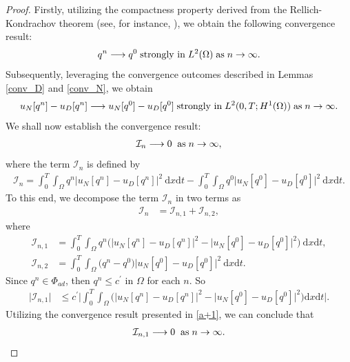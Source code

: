 \documentclass[a4paper,12pt,reqno,natbib]{amsart}
\newcommand{\dx} {\displaystyle\mathrm{d}x}
\newcommand{\dt} {\displaystyle\mathrm{d}t}
\begin{document}
\begin{proof}
 Firstly, utilizing the compactness property derived from the Rellich-Kondrachov theorem (see, for instance, \cite{brezis2010functional}), we obtain the following convergence result:
\begin{equation}\label{cv-0}
q^n\longrightarrow q^0\; \hbox{strongly in}\; L^2(\Omega)\; \hbox{as}\; n\rightarrow\infty.
\end{equation}
Subsequently, leveraging the convergence outcomes described in Lemmas \ref{conv_D} and \ref{conv_N}, we obtain
\begin{align} \label{a+1}
     u_N[q^n]- u_D[q^n] \longrightarrow  u_N[q^0]- u_D[q^0]\; \hbox{strongly in}\; L^2(0,T;H^1(\Omega))\; \hbox{as}\; n\rightarrow\infty.
\end{align}
We shall now establish the convergence result:
\begin{align*}
    \mathcal{I}_n \longrightarrow  0 \;\; \hbox{as}\; n\rightarrow\infty,
\end{align*}
where the term $\mathcal{I}_n$ is defined by
\begin{align*}
  \mathcal{I}_n=  \int_0^T \int_{\Omega}q^n\Big|
 u_N[q^n]- u_D[q^n]\Big|^2\ \dx \dt -  \int_0^T \int_{\Omega}q^0\Big|
 u_N[q^0]- u_D[q^0]\Big|^2\ \dx \dt.
\end{align*}
To this end, we decompose the term $\mathcal{I}_n$ in two terms as
\begin{align*}
  \mathcal{I}_n&=  \mathcal{I}_{n,1}+\mathcal{I}_{n,2},
\end{align*}
where
\begin{align*}
  \mathcal{I}_{n,1}&=  \int_0^T \int_{\Omega}q^n\Big(\Big|
 u_N[q^n]- u_D[q^n]\Big|^2 -\Big|
 u_N[q^0]- u_D[q^0]\Big|^2\Big) \ \dx \dt, \\
 \mathcal{I}_{n,2}&=  \int_0^T \int_{\Omega}\Big(q^n-q^0\Big)\Big|
 u_N[q^0]- u_D[q^0]\Big|^2\ \dx \dt.
\end{align*}
Since $q^n \in \Phi_{ad}$, then $q^n\leq c^\prime$ in $\Omega$ for each $n$. So
\begin{align*}
  \Big|\mathcal{I}_{n,1}\Big|&\leq  c^\prime\Big|\int_0^T \int_{\Omega}\Big(\Big|
 u_N[q^n]- u_D[q^n]\Big|^2 -\Big|
 u_N[q^0]- u_D[q^0]\Big|^2 \Big) \dx \dt\Big|.
\end{align*}
Utilizing the convergence result presented in \eqref{a+1}, we can conclude that
\begin{align} \label{cv-0+}
    \mathcal{I}_{n,1} \longrightarrow  0 \;\; \hbox{as}\; n\rightarrow\infty.
\end{align}


\end{proof}
\end{document}
